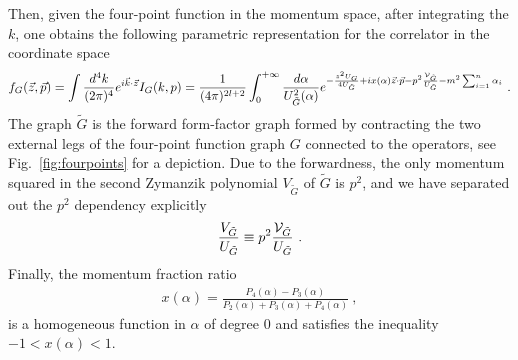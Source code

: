 \documentclass[a4paper,11pt]{article}
\begin{document}
Then, given the four-point function in the momentum space, after integrating the $k$, one obtains the following parametric representation for the correlator in the coordinate space
\begin{align}\label{eq:fGI}
f_{G}(\vec{z},\vec{p})  = \int \frac{d^4 k}{(2\pi)^4} e^{i \vec{k}\cdot \vec{z}} I_{G}(k,p)
=\frac{1}{(4\pi)^{2l+2}}\int_{0}^{+\infty}\frac{d\alpha}{U^2_{\tilde  G}(\alpha)}e^{-\frac{z^2 U_G}{4U_{\tilde G}}+ix(\alpha)\vec{z}\cdot \vec{p}-p^2\frac{{\cal V}_{\tilde G}}{U_{\tilde G}}-m^2\sum_{i=1}^n\alpha_i} \ . 
\end{align}
The graph $\tilde G$ is the forward form-factor graph formed by contracting the two external legs of the four-point function graph $G$ connected to the operators, see Fig.~\ref{fig:fourpoints} for a depiction. Due to the forwardness, the only momentum squared in the second Zymanzik polynomial $V_{\tilde G}$ of  $\tilde G$ is $p^2$, and we have separated out the $p^2$ dependency explicitly
\begin{align}
\frac{V_{\tilde G}}{U_{\tilde G}} \equiv p^2\frac{{\cal V}_{\tilde G}}{U_{\tilde G}} \ . 
\end{align}
Finally, the momentum fraction ratio 
\begin{align}
x(\alpha)=\frac{P_4(\alpha)-P_3(\alpha)}{P_2(\alpha)+P_3(\alpha)+P_4(\alpha)} \ , 
\end{align}
is a homogeneous function in $\alpha$ of degree $0$ and satisfies the inequality $-1<x(\alpha)<1$.
\end{document}
